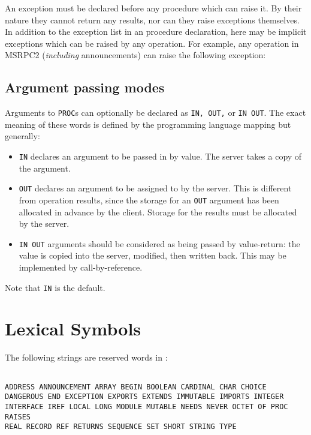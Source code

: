   An exception must be declared before any procedure which can
raise it. By their nature they cannot return any results, nor can
they raise exceptions themselves. In addition to the exception list in
an procedure declaration, here may be implicit exceptions which
can be raised by any operation. For example, any operation in MSRPC2
({\em including} announcements) can raise the following exception:


\section{Argument passing modes}


Arguments to {\tt PROC}s can optionally be declared as {\tt IN, OUT,}
or {\tt IN OUT}. The exact meaning of these words is defined by the
programming language mapping but generally:

\begin{itemize}
\item {\tt IN} declares an argument to be passed in by value. The
server takes a copy of the argument.

\item {\tt OUT} declares an argument to be assigned to by the
server. This is different from operation results, since the storage
for an {\tt OUT} argument has been allocated in advance by the
client. Storage for the results must be allocated by the server.

\item {\tt IN OUT} arguments should be considered as being passed by
value-return: the value is copied into the server, modified, then
written back. This may be implemented by call-by-reference.
\end{itemize}

Note that {\tt IN} is the default.


\appendix
\chapter{Lexical Symbols}

The following strings are reserved words in \MIDDL{}:
\begin{verbatim}

ADDRESS ANNOUNCEMENT ARRAY BEGIN BOOLEAN CARDINAL CHAR CHOICE
DANGEROUS END EXCEPTION EXPORTS EXTENDS IMMUTABLE IMPORTS INTEGER
INTERFACE IREF LOCAL LONG MODULE MUTABLE NEEDS NEVER OCTET OF PROC RAISES
REAL RECORD REF RETURNS SEQUENCE SET SHORT STRING TYPE

\end{verbatim}

